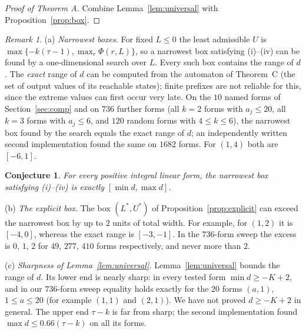 \documentclass[11pt]{amsart}
\newtheorem{conjecture}[theorem]{Conjecture}
\theoremstyle{definition}
\theoremstyle{remark}
\newtheorem{remark}[theorem]{Remark}
\begin{document}
\begin{proof}[Proof of Theorem A]
Combine Lemma~\ref{lem:universal} with Proposition~\ref{prop:box}.
\end{proof}

\begin{remark}\label{rem:boxes}
(a) \emph{Narrowest boxes.} For fixed $L\le 0$ the least admissible $U$ is $\max\{-k(\tau-1),\max_r\Phi(r,L)\}$, so a narrowest box satisfying (i)--(iv) can be found by a one-dimensional search over $L$. Every such box contains the range of $d$. The \emph{exact} range of $d$ can be computed from the automaton of Theorem~C (the set of output values of its reachable states); finite prefixes are not reliable for this, since the extreme values can first occur very late. On the $10$ named forms of Section~\ref{sec:comp} and on $736$ further forms (all $k=2$ forms with $a_j\le20$, all $k=3$ forms with $a_j\le6$, and $120$ random forms with $4\le k\le6$), the narrowest box found by the search equals the exact range of $d$; an independently written second implementation found the same on $1682$ forms. For $(1,4)$ both are $[-6,1]$.

\begin{conjecture}\label{conj:box}
For every positive integral linear form, the narrowest box satisfying (i)--(iv) is exactly $[\min d,\max d]$.
\end{conjecture}

(b) \emph{The explicit box.} The box $(L^*,U^*)$ of Proposition~\ref{prop:explicit} can exceed the narrowest box by up to $2$ units of total width. For example, for $(1,2)$ it is $[-4,0]$, whereas the exact range is $[-3,-1]$. In the $736$-form sweep the excess is $0$, $1$, $2$ for $49$, $277$, $410$ forms respectively, and never more than $2$.

(c) \emph{Sharpness of Lemma~\ref{lem:universal}.} Lemma~\ref{lem:universal} bounds the range of $d$. Its lower end is nearly sharp: in every tested form $\min d\ge-K+2$, and in our $736$-form sweep equality holds exactly for the $20$ forms $(a,1)$, $1\le a\le 20$ (for example $(1,1)$ and $(2,1)$). We have not proved $d\ge-K+2$ in general. The upper end $\tau-k$ is far from sharp; the second implementation found $\max d\le0.66(\tau-k)$ on all its forms.
\end{remark}
\end{document}
